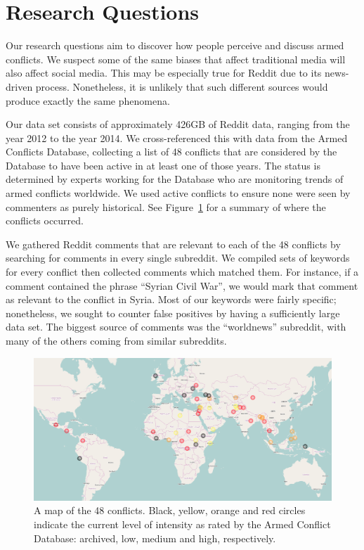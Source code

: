 \section{Research Questions}
Our research questions aim to discover how people perceive and discuss armed conflicts. We suspect some of the same biases that affect traditional media will also affect social media. This may be especially true for Reddit due to its news-driven process. Nonetheless, it is unlikely that such different sources would produce exactly the same phenomena. 

Our data set consists of approximately 426GB of Reddit data, ranging from the year 2012 to the year 2014. We cross-referenced this with data from the Armed Conflicts Database, collecting a list of 48 conflicts that are considered by the Database to have been active in at least one of those years. The status is determined by experts working for the Database who are monitoring trends of armed conflicts worldwide. We used active conflicts to ensure none were seen by commenters as purely historical. See Figure~\ref{conflicts} for a summary of where the conflicts occurred. 

We gathered Reddit comments that are relevant to each of the 48 conflicts by searching for comments in every single subreddit. We compiled sets of keywords for every conflict then collected comments which matched them. For instance, if a comment contained the phrase ``Syrian Civil War'', we would mark that comment as relevant to the conflict in Syria. Most of our keywords were fairly specific; nonetheless, we sought to counter false positives by having a sufficiently large data set. The biggest source of comments was the ``worldnews'' subreddit, with many of the others coming from similar subreddits.

\begin{figure}
\centering
\includegraphics[width=0.9\columnwidth]{map}
\caption{A map of the 48 conflicts. Black, yellow, orange and red circles indicate the current level of intensity as rated by the Armed Conflict Database: archived, low, medium and high, respectively.}
\label{conflicts}
\end{figure}